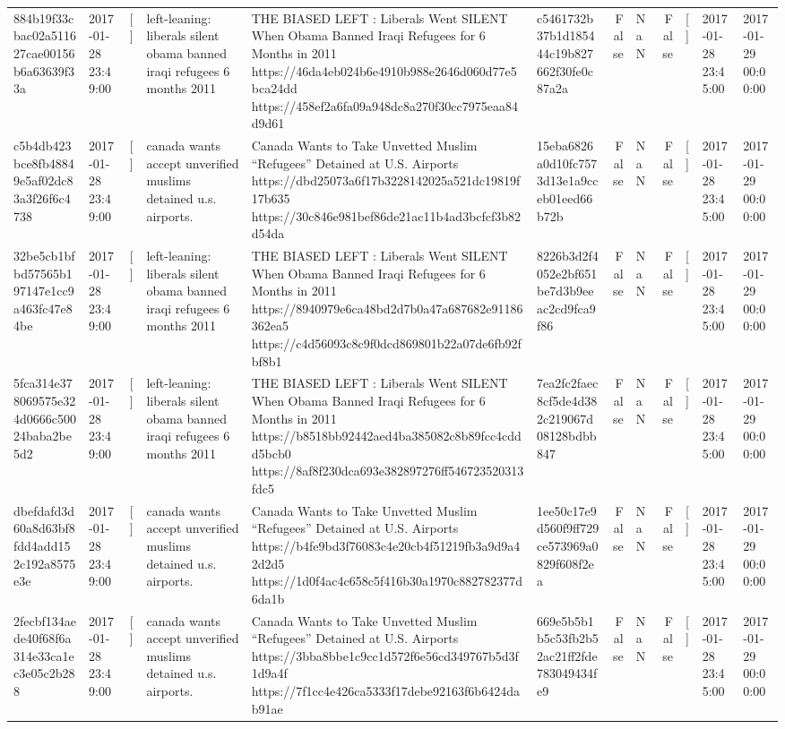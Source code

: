 \begin{tabular}{llllllrlrlll}
884b19f33cbac02a511627cae00156b6a63639f33a & 2017-01-28 23:49:00 & [] & left-leaning: liberals silent obama banned iraqi refugees 6 months 2011 & THE BIASED LEFT : Liberals Went SILENT When Obama Banned Iraqi Refugees for 6 Months in 2011 https://46da4eb024b6e4910b988e2646d060d77e5bca24dd https://458ef2a6fa09a948dc8a270f30cc7975eaa84d9d61 & c5461732b37b1d185444c19b827662f30fe0c87a2a & False & NaN & False & [] & 2017-01-28 23:45:00 & 2017-01-29 00:00:00 \\
c5b4db423bce8fb48849e5af02dc83a3f26f6c4738 & 2017-01-28 23:49:00 & [] & canada wants accept unverified muslims detained u.s. airports. & Canada Wants to Take Unvetted Muslim “Refugees” Detained at U.S. Airports https://dbd25073a6f17b3228142025a521dc19819f17b635 https://30c846e981bef86de21ac11b4ad3bcfcf3b82d54da & 15eba6826a0d10fc7573d13e1a9cceb01eed66b72b & False & NaN & False & [] & 2017-01-28 23:45:00 & 2017-01-29 00:00:00 \\
32be5cb1bfbd57565b197147e1cc9a463fc47e84be & 2017-01-28 23:49:00 & [] & left-leaning: liberals silent obama banned iraqi refugees 6 months 2011 & THE BIASED LEFT : Liberals Went SILENT When Obama Banned Iraqi Refugees for 6 Months in 2011 https://8940979e6ca48bd2d7b0a47a687682e91186362ea5 https://c4d56093c8c9f0dcd869801b22a07de6fb92fbf8b1 & 8226b3d2f4052e2bf651be7d3b9eeac2cd9fca9f86 & False & NaN & False & [] & 2017-01-28 23:45:00 & 2017-01-29 00:00:00 \\
5fca314e378069575e324d0666c50024baba2be5d2 & 2017-01-28 23:49:00 & [] & left-leaning: liberals silent obama banned iraqi refugees 6 months 2011 & THE BIASED LEFT : Liberals Went SILENT When Obama Banned Iraqi Refugees for 6 Months in 2011 https://b8518bb92442aed4ba385082c8b89fcc4cddd5bcb0 https://8af8f230dca693e382897276ff546723520313fdc5 & 7ea2fc2faec8cf5de4d382c219067d08128bdbb847 & False & NaN & False & [] & 2017-01-28 23:45:00 & 2017-01-29 00:00:00 \\
dbefdafd3d60a8d63bf8fdd4add152c192a8575e3e & 2017-01-28 23:49:00 & [] & canada wants accept unverified muslims detained u.s. airports. & Canada Wants to Take Unvetted Muslim “Refugees” Detained at U.S. Airports https://b4fe9bd3f76083c4e20cb4f51219fb3a9d9a42d2d5 https://1d0f4ac4c658c5f416b30a1970c882782377d6da1b & 1ee50c17e9d560f9ff729ce573969a0829f608f2ea & False & NaN & False & [] & 2017-01-28 23:45:00 & 2017-01-29 00:00:00 \\
2fecbf134aede40f68f6a314e33ca1ec3e05c2b288 & 2017-01-28 23:49:00 & [] & canada wants accept unverified muslims detained u.s. airports. & Canada Wants to Take Unvetted Muslim “Refugees” Detained at U.S. Airports https://3bba8bbe1c9cc1d572f6e56cd349767b5d3f1d9a4f https://7f1cc4e426ca5333f17debe92163f6b6424dab91ae & 669e5b5b1b5c53fb2b52ac21ff2fde783049434fe9 & False & NaN & False & [] & 2017-01-28 23:45:00 & 2017-01-29 00:00:00 \\

\end{tabular}
